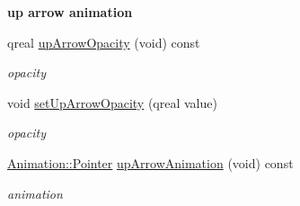 \begin{Indent}\textbf{ up arrow animation}\par
\begin{DoxyCompactItemize}
\item 
\mbox{\label{class_spin_box_data_af485d3d65be2bc001a4b0600cfee86ee}} 
qreal \hyperlink{class_spin_box_data_af485d3d65be2bc001a4b0600cfee86ee}{up\+Arrow\+Opacity} (void) const
\begin{DoxyCompactList}\small\item\em opacity \end{DoxyCompactList}\item 
\mbox{\label{class_spin_box_data_aed3b42e9e1f33ffade6016b2010031da}} 
void \hyperlink{class_spin_box_data_aed3b42e9e1f33ffade6016b2010031da}{set\+Up\+Arrow\+Opacity} (qreal value)
\begin{DoxyCompactList}\small\item\em opacity \end{DoxyCompactList}\item 
\mbox{\label{class_spin_box_data_a8ecc69476a02ada2aac13ebb9e84fcba}} 
\hyperlink{class_animation_ac48a8d074abd43dc3f6485353ba24e30}{Animation\+::\+Pointer} \hyperlink{class_spin_box_data_a8ecc69476a02ada2aac13ebb9e84fcba}{up\+Arrow\+Animation} (void) const
\begin{DoxyCompactList}\small\item\em animation \end{DoxyCompactList}\end{DoxyCompactItemize}
\end{Indent}
